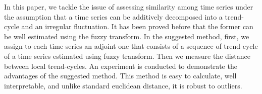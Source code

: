 
 
In this paper, we tackle the issue of assessing similarity among time series under the assumption that a time series can be additively decomposed into a trend-cycle and an irregular fluctuation.  It has been proved before that the former can be well estimated using the fuzzy transform. In the suggested method, first, we assign to each time series an adjoint one that consists of a sequence of trend-cycle of a time series estimated using fuzzy transform. Then we measure the distance between local trend-cycles. An experiment is conducted to demonstrate the advantages of the suggested method. This method is easy to calculate, well interpretable, and unlike standard euclidean distance, it is robust to outliers. 

